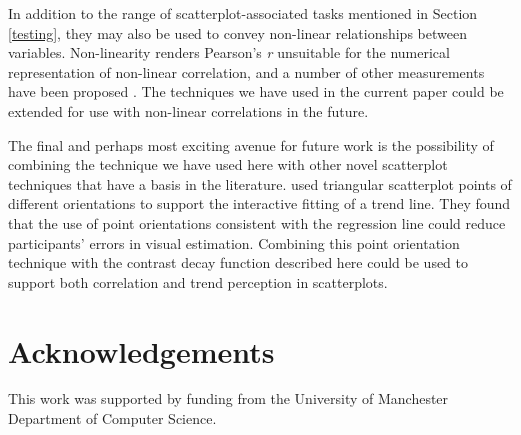\documentclass[preprint, 3p,
authoryear]{elsarticle} %
\begin{document}
In addition to the range of scatterplot-associated tasks mentioned in
Section \ref{testing}, they may also be used to convey non-linear
relationships between variables. Non-linearity renders Pearson's
\emph{r} unsuitable for the numerical representation of non-linear
correlation, and a number of other measurements have been proposed
\citep{laarne_2021}. The techniques we have used in the current paper
could be extended for use with non-linear correlations in the future.

The final and perhaps most exciting avenue for future work is the
possibility of combining the technique we have used here with other
novel scatterplot techniques that have a basis in the literature.
\citet{liu_2021} used triangular scatterplot points of different
orientations to support the interactive fitting of a trend line. They
found that the use of point orientations consistent with the regression
line could reduce participants' errors in visual estimation. Combining
this point orientation technique with the contrast decay function
described here could be used to support both correlation and trend
perception in scatterplots.

\hypertarget{acknowledgements}{%
\section{Acknowledgements}\label{acknowledgements}}

This work was supported by funding from the University of Manchester
Department of Computer Science.

\renewcommand\refname{References}

\end{document}
